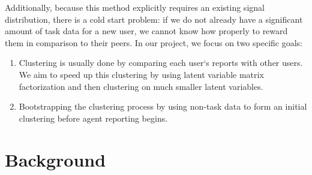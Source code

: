 \documentclass{article}
\begin{document}
Additionally, because this method explicitly requires an existing signal distribution, there is a cold start problem: if we do not already have a significant amount of task data for a new user, we cannot know how properly to reward them in comparison to their peers. In our project, we focus on two specific goals:
\begin{enumerate}
\item Clustering is usually done by comparing each user`s reports with other users. We aim to speed up this clustering by using latent variable matrix factorization and then clustering on much smaller latent variables.
\item Bootstrapping the clustering process by using non-task data to form an initial clustering before agent reporting begins.
\end{enumerate}

\section{Background}
\end{document}
